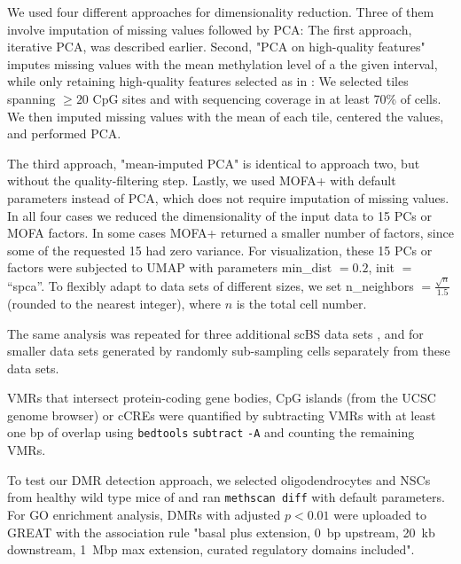 \documentclass[twocolumn,10pt]{article}
\newcommand{\new}[1]{#1} %
\begin{document}
\new{ 
We used four different approaches for dimensionality reduction. Three of them involve imputation of missing values followed by PCA:
The first approach, iterative PCA, was described earlier.
Second, "PCA on high-quality features" imputes missing values with the mean methylation level of a the given interval, while only retaining high-quality features selected as in \citet{luo2017single}:}
We selected tiles spanning $\ge20$ CpG sites and with sequencing coverage in at least 70\% of cells.
We then imputed missing values with the mean of each tile, centered the values, and performed PCA.
\new{
The third approach, "mean-imputed PCA" is identical to approach two, but without the quality-filtering step.
Lastly, we used MOFA+ with default parameters instead of PCA, which does not require imputation of missing values. 
In all four cases we reduced the dimensionality of the input data to 15 PCs or MOFA factors. In some cases MOFA+ returned a smaller number of factors, since some of the requested 15 had zero variance.
For visualization, these 15 PCs or factors were subjected to UMAP with parameters min\_dist $=0.2$, init $=$ ``spca''.
To flexibly adapt to data sets of different sizes, we set n\_neighbors  $=\frac{\sqrt{n}}{1.5}$ (rounded to the nearest integer), where $n$ is the total cell number.
}
The same analysis was repeated for \new{three additional scBS data sets \citep{luo2017single, bian2018single, argelaguet2019gastru}}, and for smaller data sets generated by randomly sub-sampling cells separately from \new{these} data sets.

\new{VMRs that intersect protein-coding gene bodies, CpG islands (from the UCSC genome browser) or cCREs were quantified by subtracting VMRs with at least one bp of overlap using \texttt{bedtools} \texttt{subtract} \texttt{-A} \citep{quinlan2010bedtools} and counting the remaining VMRs.
}

To test our DMR detection approach, we selected oligodendrocytes and NSCs from healthy wild type mice of \citet{kremer_scnmt} and ran \texttt{methscan diff} with default parameters.
For GO enrichment analysis, DMRs with adjusted $p<0.01$ were uploaded to GREAT \citep{mclean2010great} with the association rule "basal plus extension, 0~bp upstream, 20~kb downstream, 1~Mbp max extension, curated regulatory domains included".
\end{document}
